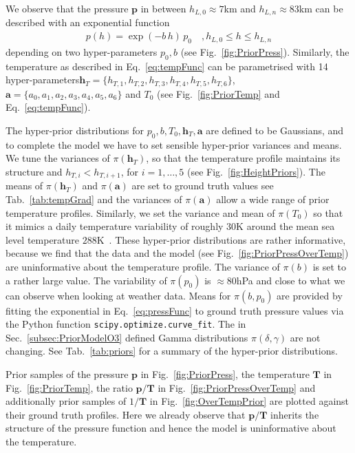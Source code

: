 We observe that the pressure $\bm{p}$ in between $h_{L,0} \approx 7$km and $h_{L,n} \approx 83$km can be described with an exponential function
\begin{align}
	p(h) =
	\exp \left( -b \, h \right)   \,  p_0 \quad , \text{$h_{L,0}  \leq h \leq h_{L,n}$}
	\label{eq:pressFunc}
\end{align}
depending on two hyper-parameters $p_0,b$ (see Fig.~\ref{fig:PriorPress}).
Similarly, the temperature as described in Eq.~\ref{eq:tempFunc} can be parametrised with 14 hyper-parameters\linebreak $\bm{h}_T = \{ h_{T,1}, h_{T,2},h_{T,3},h_{T,4},h_{T,5},h_{T,6} \}$, $\bm{a} = \{a_0, a_1, a_2,a_3,a_4,a_5,a_6 \} $ and $T_0$ (see Fig.~\ref{fig:PriorTemp} and Eq.~\ref{eq:tempFunc}).

The hyper-prior distributions for $p_0,b, T_0,\bm{h}_T ,\bm{a} $ are defined to be Gaussians, and to complete the model we have to set sensible hyper-prior variances and means.
We tune the variances of $\pi(\bm{h}_T)$, so that the temperature profile maintains its structure and $ h_{T, i} < h_{T, i+1}$, for $i = 1,\dots, 5$ (see Fig.~\ref{fig:HeightPriors}).
The means of $\pi(\bm{h}_T)$ and $\pi(\bm{a})$ are set to ground truth values see Tab.~\ref{tab:tempGrad} and the variances of $\pi(\bm{a})$ allow a wide range of prior temperature profiles.
Similarly, we set the variance and mean of $\pi(T_0)$ so that it mimics a daily temperature variability of roughly $30$K around the mean sea level temperature $288$K~\cite{atmosphere1976us}.
These hyper-prior distributions are rather informative, because we find that the data and the model (see Fig.~\ref{fig:PriorPressOverTemp}) are uninformative about the temperature profile.
The variance of $\pi(b)$ is set to a rather large value.
The variability of $\pi(p_0)$ is $\approx 80$hPa and close to what we can observe when looking at weather data.
Means for $\pi(b ,p_0)$ are provided by fitting the exponential in Eq.~\ref{eq:pressFunc} to ground truth pressure values via the Python function \texttt{scipy.optimize.curve\_fit}.
The in Sec.~\ref{subsec:PriorModelO3} defined Gamma distributions $\pi(\delta,\gamma)$ are not changing.
See Tab.~\ref{tab:priors} for a summary of the hyper-prior distributions.

Prior samples of the pressure $\bm{p}$ in Fig.~\ref{fig:PriorPress}, the temperature $\bm{T}$ in Fig.~\ref{fig:PriorTemp}, the ratio $\bm{p}/\bm{T}$ in Fig.~\ref{fig:PriorPressOverTemp} and additionally prior samples of $1/\bm{T}$ in Fig.~\ref{fig:OverTempPrior} are plotted against their ground truth profiles.
Here we already observe that $\bm{p}/\bm{T}$ inherits the structure of the pressure function and hence the model is uninformative about the temperature.
\clearpage
